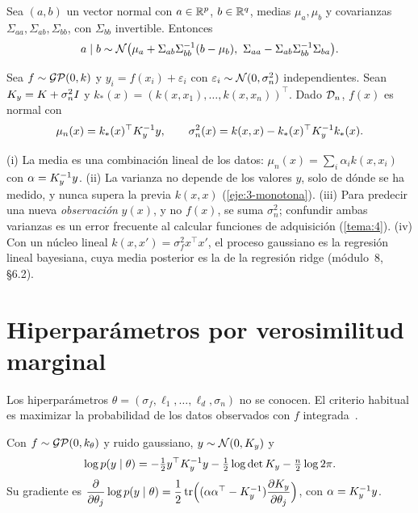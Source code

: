 \begin{lema}\label{lem:condicion}
Sea $(a,b)$ un vector normal con $a\in\mathbb{R}^{p}$, $b\in\mathbb{R}^{q}$, medias $\mu_a,\mu_b$ y covarianzas $\Sigma_{aa},\Sigma_{ab},\Sigma_{bb}$, con $\Sigma_{bb}$ invertible. Entonces
\[
a\mid b\sim\N\bigl(\mu_a+\Sigma_{ab}\Sigma_{bb}^{-1}(b-\mu_b),\ \Sigma_{aa}-\Sigma_{ab}\Sigma_{bb}^{-1}\Sigma_{ba}\bigr).
\]
\end{lema}

\begin{teorema}\label{teo:posterior}
Sea $f\sim\mathcal{GP}(0,k)$ y $y_i=f(x_i)+\varepsilon_i$ con $\varepsilon_i\sim\mathcal{N}(0,\sigma_n^2)$ independientes. Sean $K_{y}=K+\sigma_n^2I$ y $k_*(x)=(k(x,x_1),\dots,k(x,x_n))^\top$. Dado $\mathcal{D}_n$, $f(x)$ es normal con
\[
\mu_n(x)=k_*(x)^\top K_{y}^{-1}y,\qquad \sigma_n^2(x)=k(x,x)-k_*(x)^\top K_{y}^{-1}k_*(x).
\]
\end{teorema}

\begin{observacion}\label{obs:posterior}
(i) La media es una combinación lineal de los datos: $\mu_n(x)=\sum_i\alpha_ik(x,x_i)$ con $\alpha=K_{y}^{-1}y$. (ii) La varianza no depende de los valores $y$, solo de dónde se ha medido, y nunca supera la previa $k(x,x)$ (\cref{eje:3-monotona}). (iii) Para predecir una nueva \emph{observación} $y(x)$, y no $f(x)$, se suma $\sigma_n^2$; confundir ambas varianzas es un error frecuente al calcular funciones de adquisición (\cref{tema:4}). (iv) Con un núcleo lineal $k(x,x')=\sigma_f^2x^\top x'$, el proceso gaussiano es la regresión lineal bayesiana, cuya media posterior es la de la regresión ridge (módulo~8, §6.2).
\end{observacion}

\addtocounter{definicion}{1}%

\section{Hiperparámetros por verosimilitud marginal}

Los hiperparámetros $\theta=(\sigma_f,\ell_1,\dots,\ell_d,\sigma_n)$ no se conocen. El criterio habitual es maximizar la probabilidad de los datos observados con $f$ integrada~\cite[cap.~5]{rw}.

\begin{proposicion}\label{prop:lml}
Con $f\sim\mathcal{GP}(0,k_\theta)$ y ruido gaussiano, $y\sim\mathcal{N}(0,K_{y})$ y
\begin{equation}\label{eq:lml}
\log p(y\mid\theta)=-\tfrac12y^\top K_{y}^{-1}y-\tfrac12\log\det K_{y}-\tfrac n2\log 2\pi .
\end{equation}
Su gradiente es $\dfrac{\partial}{\partial\theta_j}\log p(y\mid\theta)=\dfrac12\operatorname{tr}\Bigl((\alpha\alpha^\top-K_{y}^{-1})\dfrac{\partial K_{y}}{\partial\theta_j}\Bigr)$, con $\alpha=K_{y}^{-1}y$.
\end{proposicion}

